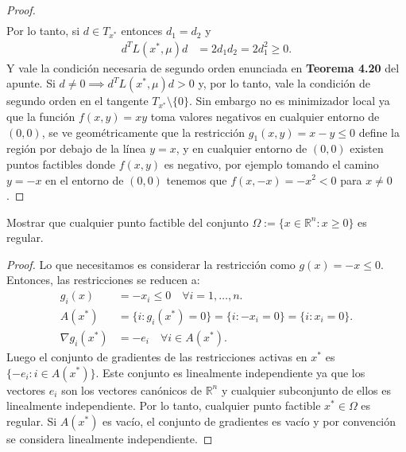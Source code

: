 \documentclass{article}
\newcommand{\R}{\mathbb{R}}
\newenvironment{theorem}[2][Ejercicio]{\begin{trivlist}
\item[\hskip \labelsep {\bfseries #1}\hskip \labelsep {\bfseries #2.}]}{\end{trivlist}}
\begin{document}
\begin{proof}
\begin{align*}
    \end{align*}
    Por lo tanto, si \( d \in T_{x^*} \) entonces \( d_1 = d_2 \) y \begin{align*}
        d^T L(x^*, \mu) d & = 2 d_1 d_2 = 2 d_1^2 \geq 0.
    \end{align*}
    Y vale la condición necesaria de segundo orden enunciada en \textbf{Teorema 4.20} del apunte. Si \( d \neq 0 \implies d^T L(x^*, \mu) d > 0 \) y, por lo tanto, vale la condición de segundo orden en el tangente \( T_{x^*} \setminus \{ 0 \} \).
    Sin embargo no es minimizador local ya que la función \( f(x, y) = xy \) toma valores negativos en cualquier entorno de \( (0, 0) \), se ve
    geométricamente que la restricción \( g_1(x, y) = x - y \leq 0 \) define la región por debajo de la línea \( y = x \), y en cualquier entorno de \( (0, 0) \) existen puntos factibles donde \( f(x, y) \) es negativo,
    por ejemplo tomando el camino \( y = -x \) en el entorno de \( (0, 0) \) tenemos que \( f(x, -x) = -x^2 < 0 \) para \( x \neq 0 \).
\end{proof}

\begin{theorem}{12}
    Mostrar que cualquier punto factible del conjunto \( \Omega := \{ x \in \R^n : x \geq 0 \} \) es regular.
\end{theorem}

\begin{proof}
    Lo que necesitamos es considerar la restricción como \( g(x) = -x \leq 0 \). Entonces, las restricciones se reducen a: \begin{align*}
        g_i(x)          & = -x_i \leq 0 \quad \forall i = 1, \ldots, n.                      \\
        A(x^*)          & = \{ i : g_i(x^*) = 0 \} = \{ i : -x_i = 0 \} = \{ i : x_i = 0 \}. \\
        \nabla g_i(x^*) & = -e_i \quad \forall i \in A(x^*).
    \end{align*}
    Luego el conjunto de gradientes de las restricciones activas en \( x^* \) es \( \{ -e_i : i \in A(x^*) \} \).
    Este conjunto es linealmente independiente ya que los vectores \( e_i \) son los vectores canónicos de \( \R^n \) y cualquier subconjunto de ellos es linealmente independiente.
    Por lo tanto, cualquier punto factible \( x^* \in \Omega \) es regular. Si \( A(x^*) \) es vacío, el conjunto de gradientes es vacío y por convención se considera linealmente independiente.
\end{proof}
\end{document}
